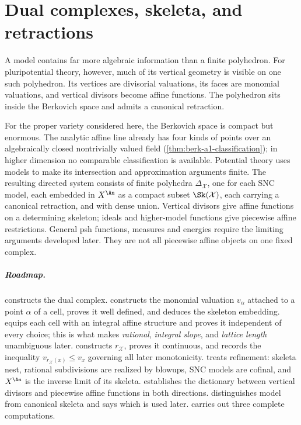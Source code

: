 \chapter{Dual complexes, skeleta, and retractions}
\label{chap:skeleta}

A model contains far more algebraic information than a finite polyhedron.
For pluripotential theory, however, much of its vertical geometry is visible
on one such polyhedron. Its vertices are divisorial valuations, its faces
are monomial valuations, and vertical divisors become affine functions. The
polyhedron sits inside the Berkovich space and admits a canonical retraction.

For the proper variety considered here, the Berkovich space is compact but
enormous. The analytic affine line already has four kinds of points over an
algebraically closed nontrivially valued field
(\cref{thm:berk-a1-classification}); in higher dimension no comparable
classification is available. Potential theory uses models to make its
intersection and approximation arguments finite. The resulting directed
system consists of finite
polyhedra $\Delta_{\mathcal X}$, one for each SNC model, each embedded in
$X^{\An}$ as a compact subset $\Sk(\mathcal X)$, each carrying a
canonical retraction, and with dense union. Vertical divisors give affine
functions on a determining skeleton; ideals and higher-model functions
give piecewise affine restrictions. General psh functions, measures and
energies require the limiting arguments developed later. They are not all
piecewise affine objects on one fixed complex.

\paragraph{Roadmap.}
 constructs the dual complex. 
constructs the monomial valuation $v_\alpha$ attached to a point
$\alpha$ of a cell, proves it well defined, and deduces the skeleton
embedding.  equips each cell with an integral
affine structure and proves it independent of every choice; this is what
makes \emph{rational}, \emph{integral slope}, and \emph{lattice length}
unambiguous later.  constructs
$r_{\mathcal X}$, proves it continuous, and records the inequality
$v_{r_{\mathcal X}(x)}\le v_x$ governing all later monotonicity.
 treats refinement: skeleta nest, rational
subdivisions are realized by blowups, SNC models are cofinal, and
$X^{\An}$ is the inverse limit of its skeleta.
 establishes the dictionary between
vertical divisors and piecewise affine functions in both directions.
 distinguishes model from canonical skeleta and
says which is used later.  carries out three
complete computations.

